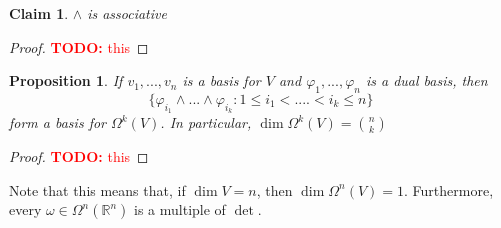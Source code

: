 \documentclass{article}
\newtheorem{claim}{Claim}
\newtheorem{proposition}{Proposition}
\newcommand{\reals}[0]{\mathbb{R}}
\newcommand{\TODO}[1]{\textcolor{red}{\textbf{TODO:} #1}}
\begin{document}
\begin{claim}
  \(\wedge\) is associative
\end{claim}
\begin{proof}
  \TODO{this}
\end{proof}

\begin{proposition}
  If \(v_1,...,v_n\) is a basis for \(V\) and \(\varphi_1,...,\varphi_n\) is a dual basis, then
  \begin{equation}
    \{\varphi_{i_1} \wedge ... \wedge \varphi_{i_k} : 1 \leq i_1 < .... < i_k \leq n\}
  \end{equation}
  form a basis for \(\Omega^k(V)\). In particular, \(\dim\Omega^k(V) = {n \choose k}\)
\end{proposition}
\begin{proof}
  \TODO{this}
\end{proof}

Note that this means that, if \(\dim V = n\), then \(\dim \Omega^n(V) = 1\). Furthermore, every \(\omega \in \Omega^n(\reals^n)\) is a multiple of \(\det\).
\end{document}
